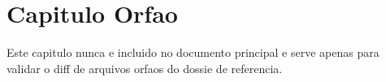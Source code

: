 \section{Capitulo Orfao}

Este capitulo nunca e incluido no documento principal e serve apenas para
validar o diff de arquivos orfaos do dossie de referencia.
